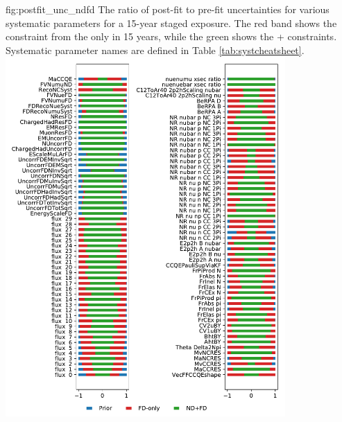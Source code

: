 \begin{dunefigure}{fig:postfit_unc_ndfd}
{The ratio of post-fit to pre-fit uncertainties for various systematic parameters for a 15-year staged exposure. The red band shows the constraint from the  only in 15 years, while the green shows the + constraints. Systematic parameter names are defined in Table \ref{tab:systcheatsheet}.}
  \includegraphics[width=0.8\textwidth]{graphics/nuisancePostFits_15_FDvsNDFD_th13_v4_1.pdf}
\end{dunefigure}

